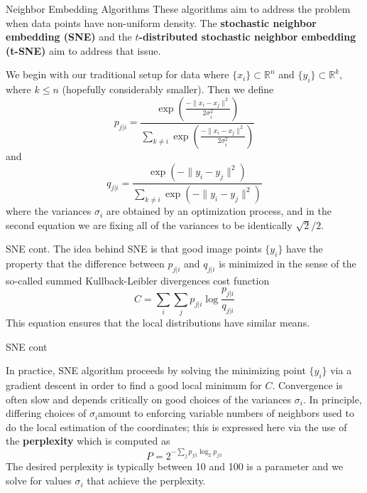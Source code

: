 \documentclass{beamer}
\begin{document}
\begin{frame}{Neighbor Embedding Algorithms}
	These algorithms aim to address the problem when data points have non-uniform density. The \textbf{stochastic neighbor embedding (SNE)} and the \textbf{$t$-distributed stochastic neighbor embedding (t-SNE)} aim to address that issue.
	
	We begin with our traditional setup for data where $\{x_i\} \subset \mathbb{R}^n$ and $\{y_i\} \subset \mathbb{R}^k$, where $k \le n$ (hopefully considerably smaller). Then we define
	\begin{equation*}
		p_{j|i}= \frac{ \exp( \frac{- \|x_i -x_j\|^2}{2\sigma_i^2})}{ \sum_{k\ne i}\exp( \frac{- \|x_i -x_j\|^2}{2\sigma_i^2})}
	\end{equation*}
	and
	\begin{equation*}
		q_{j|i}= \frac{ \exp( - \|y_i -y_j\|^2)}{ \sum_{k\ne i}\exp( - \|y_i -y_j\|^2)}
	\end{equation*}
		where the variances $\sigma_i$ are obtained by an optimization process, and in the second equation we are fixing all of the variances to be identically $\sqrt{2}/2$. 
\end{frame}
\begin{frame}{SNE cont.}
	The idea behind SNE is that good image points $\{y_i\}$ have the property that the difference between $p_{j|i}$ and $q_{j|i}$ is minimized in the sense of the so-called summed Kullback-Leibler divergences cost function
	\begin{equation*}
		C= \sum_i \sum_j p_{j|i} \log \frac{p_{j|i}}{q_{j|i}}
	\end{equation*} 
	This equation ensures that the local distributions have similar means. 
	
	

\end{frame}

\begin{frame}{SNE cont}
	
	In practice, SNE algorithm proceeds by solving the minimizing point $\{y_i\}$ via a gradient descent in order to find a good local minimum for $C$.  Convergence is often slow and depends critically on good choices of the variances $\sigma_i$. In principle, differing choices of $\sigma_i$amount to enforcing variable numbers of neighbors used to do the local estimation of the coordinates; this is expressed here via the use of the \textbf{perplexity} which is computed as
	\begin{equation*}
		P= 2^{- \sum_j p_{j|i}\log_2 p_{j|i}}
	\end{equation*}
	The desired perplexity is typically between 10 and 100 is a parameter and we solve for values $\sigma_i$ that achieve the perplexity.

\end{frame}
\end{document}
